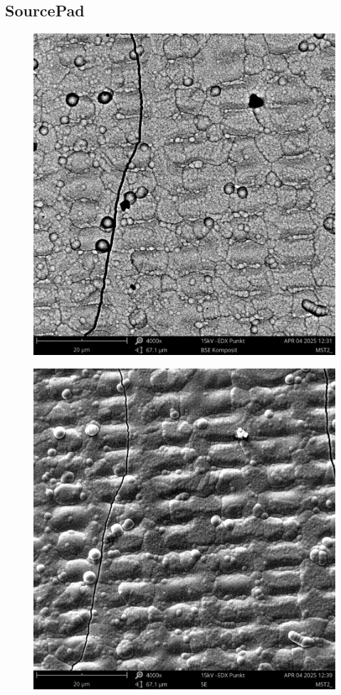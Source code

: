 \subsection{SourcePad}
    \begin{figure}[H]
        \centering
        \begin{minipage}{.5\textwidth}
          \centering
          \includegraphics[width=.9\linewidth]{Bilder/MST2_0019}
          \label{Abb.2: REM-Aufnahme(BSE Komposit, 4000x) des SourcePads mit Punktanalyse}
        \end{minipage}%
        \begin{minipage}{.5\textwidth}
          \centering
          \includegraphics[width=.9\linewidth]{Bilder/MST2_0022}

\end{minipage}
\end{figure}
